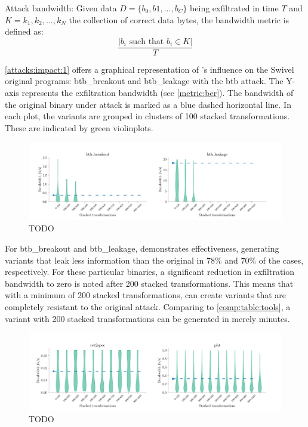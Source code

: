 \begin{definition}{Attack bandwidth:}\label{metric:ber}
    Given data $D=\{b_0, b1, ..., b_C\}$ being exfiltrated in time $T$ and $K = {k_1, k_2, ..., k_N}$ the collection of correct data bytes, the bandwidth metric is defined as:
    $$
        \frac{|b_i\text{ such that } b_i \in K|}{T}
    $$
\end{definition}




\autoref{attacks:impact:1} offers a graphical representation of \tool's influence on the Swivel original programs: btb\_breakout and btb\_leakage with the btb attack. 
The Y-axis represents the exfiltration bandwidth (see \autoref{metric:ber}). 
The bandwidth of the original binary under attack is marked as a blue dashed horizontal line.
In each plot, the variants are grouped in clusters of 100 stacked transformations. 
These are indicated by green violinplots.

\begin{figure}[h]
    \centering
    \includegraphics[width=\linewidth]{plots/spectre/results.rq3.1.pdf}
    \caption{TODO}
  \label{attacks:impact:1}
\end{figure}

 For btb\_breakout and btb\_leakage, \tool demonstrates effectiveness, generating variants that leak less information than the original in 78\% and 70\% of the cases, respectively.
For these particular binaries, a significant reduction in exfiltration bandwidth to zero is noted after 200 stacked transformations.
This means that with a minimum of 200 stacked transformations, \tool can create variants that are completely resistant to the original attack.
Comparing to \autoref{comp:table:tools}, a variant with 200 stacked transformations can be generated in merely minutes.



\begin{figure}[h]
    \centering    
    \includegraphics[width=\linewidth]{plots/spectre/results.rq3.2.pdf}
    \caption{TODO}
  \label{attacks:impact:2}
\end{figure}


